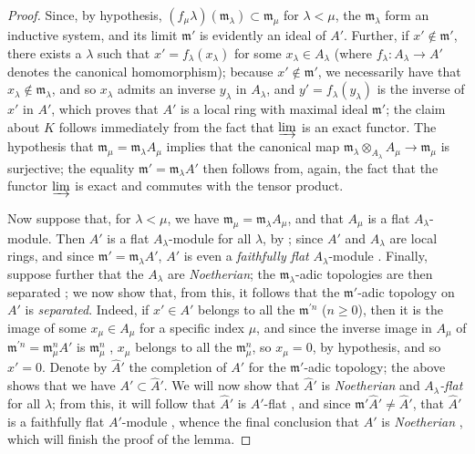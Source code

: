 \begin{proof}
Since, by hypothesis, $(f_\mu\lambda)(\mathfrak{m}_\lambda)\subset\mathfrak{m}_\mu$ for $\lambda<\mu$, the $\mathfrak{m}_\lambda$ form an inductive system, and its limit $\mathfrak{m}'$ is evidently an ideal of $A'$.
Further, if $x'\not\in\mathfrak{m}'$, there exists a $\lambda$ such that $x'=f_\lambda(x_\lambda)$ for some $x_\lambda\in A_\lambda$ (where $f_\lambda:A_\lambda\to A'$ denotes the canonical homomorphism);
because $x'\not\in\mathfrak{m}'$, we necessarily have that $x_\lambda\not\in\mathfrak{m}_\lambda$, and so $x_\lambda$ admits an inverse $y_\lambda$ in $A_\lambda$, and $y'=f_\lambda(y_\lambda)$ is the inverse of $x'$ in $A'$, which proves that $A'$ is a local ring with maximal ideal $\mathfrak{m}'$;
the claim about $K$ follows immediately from the fact that $\varinjlim$ is an exact functor.
The hypothesis that $\mathfrak{m}_\mu=\mathfrak{m}_\lambda A_\mu$ implies that the canonical map $\mathfrak{m}_\lambda\otimes_{A_\lambda}A_\mu\to\mathfrak{m}_\mu$ is surjective;
the equality $\mathfrak{m}'=\mathfrak{m}_\lambda A'$ then follows from, again, the fact that the functor $\varinjlim$ is exact and commutes with the tensor product.

Now suppose that, for $\lambda<\mu$, we have $\mathfrak{m}_\mu=\mathfrak{m}_\lambda A_\mu$, and that $A_\mu$ is a flat $A_\lambda$-module.
Then $A'$ is a flat $A_\lambda$-module for all $\lambda$, by ;
since $A'$ and $A_\lambda$ are local rings, and since $\mathfrak{m}'=\mathfrak{m}_\lambda A'$, $A'$ is even a \emph{faithfully flat} $A_\lambda$-module .
Finally, suppose further that the $A_\lambda$ are \emph{Noetherian};
the $\mathfrak{m}_\lambda$-adic topologies are then separated ;
we now show that, from this, it follows that the $\mathfrak{m}'$-adic topology on $A'$ is \emph{separated}.
Indeed, if $x'\in A'$ belongs to all the $\mathfrak{m}^{'n}$ ($n\geq0$), then it is the image of some $x_\mu\in A_\mu$ for a specific index $\mu$, and since the inverse image in $A_\mu$ of $\mathfrak{m}^{'n}=\mathfrak{m}_\mu^n A'$ is $\mathfrak{m}_\mu^n$ , $x_\mu$ belongs to all the $\mathfrak{m}_\mu^n$, so $x_\mu=0$, by hypothesis, and so $x'=0$.
Denote by $\widehat{A}'$ the completion of $A'$ for the $\mathfrak{m}'$-adic topology;
the above shows that we have $A'\subset\widehat{A}'$.
We will now show that $\widehat{A}'$ is \emph{Noetherian} and \emph{$A_\lambda$-flat} for all $\lambda$;
from this,
it will follow that $\widehat{A}'$ is $A'$-flat , and since $\mathfrak{m}'\widehat{A}'\neq\widehat{A}'$, that $\widehat{A}'$ is a faithfully flat $A'$-module , whence the final conclusion that $A'$ is \emph{Noetherian} , which will finish the proof of the lemma.


\end{proof}
